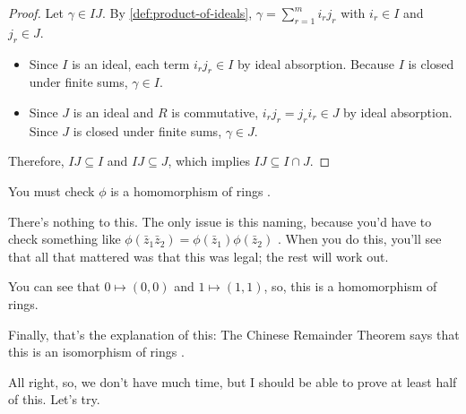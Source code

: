 \begin{content}

\begin{proof}
Let $\gamma \in IJ$. By \cref{def:product-of-ideals}, $\gamma = \sum_{r=1}^m i_r j_r$ with $i_r \in I$ and $j_r \in J$.
\begin{itemize}
    \item Since $I$ is an ideal, each term $i_r j_r \in I$ by ideal absorption. Because $I$ is closed under finite sums, $\gamma \in I$.
    \item Since $J$ is an ideal and $R$ is commutative, $i_r j_r = j_r i_r \in J$ by ideal absorption. Since $J$ is closed under finite sums, $\gamma \in J$.
\end{itemize}
Therefore, $IJ \subseteq I$ and $IJ \subseteq J$, which implies $IJ \subseteq I \cap J$.
\end{proof}
\end{content}

\begin{speech}[01:26:33 - 01:27:32]
You must check $\phi$ is a homomorphism of rings .

There's nothing to this. The only issue is this naming, because you'd have to check something like $\phi(\bar{z}_1 \bar{z}_2) = \phi(\bar{z}_1) \phi(\bar{z}_2)$ . When you do this, you'll see that all that mattered was that this was legal; the rest will work out.

You can see that $0 \mapsto (0, 0)$ and $1 \mapsto (1, 1)$, so, this is a homomorphism of rings.

Finally, that's the explanation of this: The Chinese Remainder Theorem says that this is an isomorphism of rings .

All right, so, we don't have much time, but I should be able to prove at least half of this. Let's try.
\end{speech}

